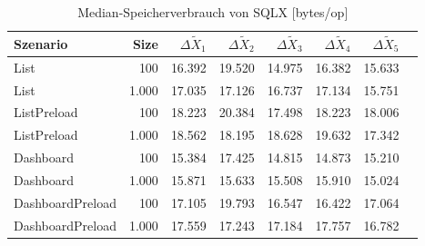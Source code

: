 
\begin{table}[ht]
\setlength{\extrarowheight}{-1pt}
\centering
\caption{Median-Speicherverbrauch von SQLX [bytes/op]}
\begin{tabular}{lrrrrrrr}
\toprule
Szenario & Size & ${\Delta \tilde{X}_1}$ & ${\Delta \tilde{X}_2}$ & ${\Delta \tilde{X}_3}$ & ${\Delta \tilde{X}_4}$ & ${\Delta \tilde{X}_5}$ \\
\midrule
	List & 100 & \cellcolor{red!20}  16.392 & \cellcolor{red!24}  19.520 & \cellcolor{red!15}  14.975 & \cellcolor{red!18}  16.382 & \cellcolor{red!15}  15.633 \\
	List & 1.000 & \cellcolor{red!23}  17.035 & \cellcolor{red!23}  17.126 & \cellcolor{red!18}  16.737 & \cellcolor{red!18}  17.134 & \cellcolor{red!18}  15.751 \\
	ListPreload & 100 & \cellcolor{red!4}  18.223 & \cellcolor{red!4}  20.384 & \cellcolor{red!4}  17.498 & \cellcolor{red!4}  18.223 & \cellcolor{red!3}  18.006 \\
	ListPreload & 1.000 & \cellcolor{red!5}  18.562 & \cellcolor{red!3}  18.195 & \cellcolor{red!3}  18.628 & \cellcolor{red!8}  19.632 & \cellcolor{red!2}  17.342 \\
	Dashboard & 100 & \cellcolor{red!15}  15.384 & \cellcolor{red!12}  17.425 & \cellcolor{red!15}  14.815 & \cellcolor{red!14}  14.873 & \cellcolor{red!15}  15.210 \\
	Dashboard & 1.000 & \cellcolor{red!14}  15.871 & \cellcolor{red!12}  15.633 & \cellcolor{red!13}  15.508 & \cellcolor{red!12}  15.910 & \cellcolor{red!12}  15.024 \\
	DashboardPreload & 100 & \cellcolor{red!10}  17.105 & \cellcolor{red!9}  19.793 & \cellcolor{red!9}  16.547 & \cellcolor{red!9}  16.422 & \cellcolor{red!10}  17.064 \\
	DashboardPreload & 1.000 & \cellcolor{red!8}  17.559 & \cellcolor{red!7}  17.243 & \cellcolor{red!8}  17.184 & \cellcolor{red!8}  17.757 & \cellcolor{red!8}  16.782 \\
\bottomrule
\end{tabular}
\label{tab:speicherverbrauch_sqlx}
\end{table}
	